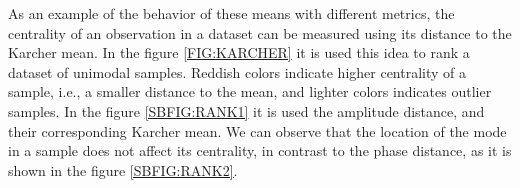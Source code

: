 As an example of the behavior of these means with different metrics,
the centrality of an observation in a dataset  can be measured using its
distance to the Karcher mean. In the figure \ref{FIG:KARCHER} it is used this idea to rank a dataset of
unimodal samples. Reddish colors indicate higher centrality of a sample, i.e.,
a smaller distance to the mean, and lighter colors indicates outlier samples.
In the figure \ref{SBFIG:RANK1} it is used the amplitude distance, and their
corresponding Karcher mean. We can observe that the location of the mode in a
sample does not affect its centrality, in contrast to the phase distance,
as it is shown in the figure \ref{SBFIG:RANK2}.
